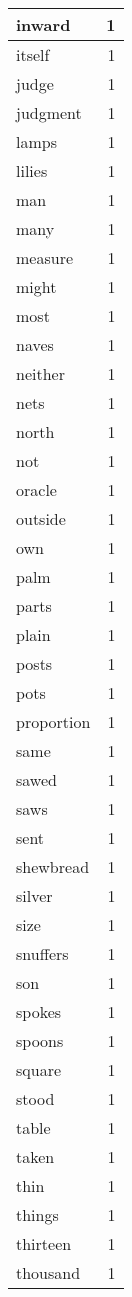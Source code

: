 \begin{center}
\begin{longtable}{l|r}
inward & 1 \\ \hline
itself & 1 \\ \hline
judge & 1 \\ \hline
judgment & 1 \\ \hline
lamps & 1 \\ \hline
lilies & 1 \\ \hline
man & 1 \\ \hline
many & 1 \\ \hline
measure & 1 \\ \hline
might & 1 \\ \hline
most & 1 \\ \hline
naves & 1 \\ \hline
neither & 1 \\ \hline
nets & 1 \\ \hline
north & 1 \\ \hline
not & 1 \\ \hline
oracle & 1 \\ \hline
outside & 1 \\ \hline
own & 1 \\ \hline
palm & 1 \\ \hline
parts & 1 \\ \hline
plain & 1 \\ \hline
posts & 1 \\ \hline
pots & 1 \\ \hline
proportion & 1 \\ \hline
same & 1 \\ \hline
sawed & 1 \\ \hline
saws & 1 \\ \hline
sent & 1 \\ \hline
shewbread & 1 \\ \hline
silver & 1 \\ \hline
size & 1 \\ \hline
snuffers & 1 \\ \hline
son & 1 \\ \hline
spokes & 1 \\ \hline
spoons & 1 \\ \hline
square & 1 \\ \hline
stood & 1 \\ \hline
table & 1 \\ \hline
taken & 1 \\ \hline
thin & 1 \\ \hline
things & 1 \\ \hline
thirteen & 1 \\ \hline
thousand & 1 \\ \hline

\end{longtable}
\end{center}
